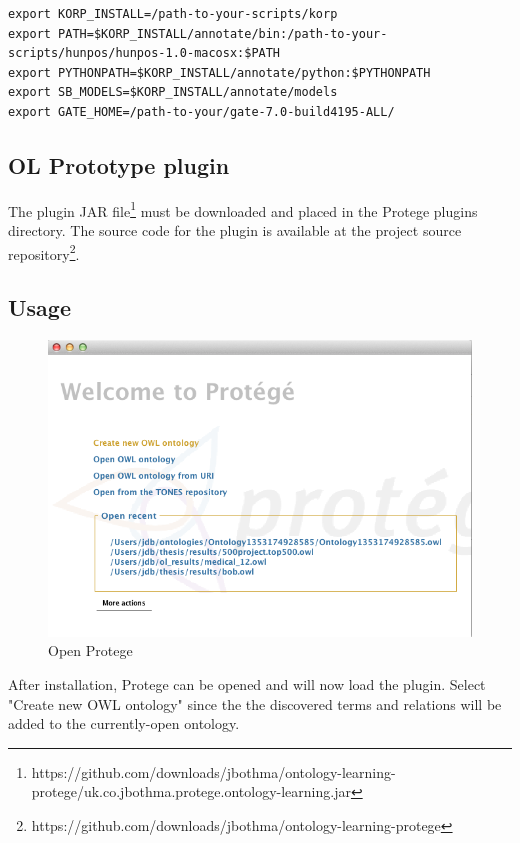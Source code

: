 \documentclass[a4paper]{report}
\begin{document}
\begin{Code}
\begin{lstlisting}[frame=single]
export KORP_INSTALL=/path-to-your-scripts/korp
export PATH=$KORP_INSTALL/annotate/bin:/path-to-your-scripts/hunpos/hunpos-1.0-macosx:$PATH
export PYTHONPATH=$KORP_INSTALL/annotate/python:$PYTHONPATH
export SB_MODELS=$KORP_INSTALL/annotate/models
export GATE_HOME=/path-to-your/gate-7.0-build4195-ALL/
\end{lstlisting}
\end{Code}

\subsection{OL Prototype plugin}

The plugin JAR file\footnote{https://github.com/downloads/jbothma/ontology-learning-protege/uk.co.jbothma.protege.ontology-learning.jar} must be downloaded and placed in the Protege plugins directory.
The source code for the plugin is available at the project source repository\footnote{https://github.com/downloads/jbothma/ontology-learning-protege}.

\subsection{Usage}
\label{subsec:results:usage}

\begin{figure}[H]
  \centering
  \includegraphics[width=.69\textwidth]{graphics/1._Open_Protege.png}
  \caption{Open Protege}
  \label{fig:walkthrough1}
\end{figure}
After installation, Protege can be opened and will now load the plugin. Select "Create new OWL ontology" since the the discovered terms and relations will be added to the currently-open ontology.
\end{document}
